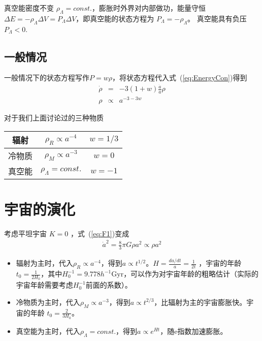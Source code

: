 \documentclass[12pt]{ctexart}
\newcommand{\refeq}[1]{式~(\ref{#1})}
\begin{document}
真空能密度不变 $\rho_\Lambda=const.$，膨胀时外界对内部做功，能量守恒$\Delta E = -\rho_\Lambda \Delta V = P_\Lambda \Delta V$，即真空能的状态方程为 $P_\Lambda = -\rho_\Lambda$。 真空能具有负压 $P_\Lambda < 0 $.

\subsection{一般情况}

一般情况下的状态方程写作$P=w\rho$，将状态方程代入\refeq{eq:EnergyCon}得到
\begin{eqnarray}
    \dot{\rho} &=& -3(1+w) \frac{\dot{a}}{a} \rho 
    \\ \rho &\propto& a^{-3-3w}
\end{eqnarray}

对于我们上面讨论过的三种物质
\begin{table}[htb]
    \centering
    \begin{tabular}{|c|c|c|}
    \hline
    辐射  & $\rho_R\propto a^{-4}$ & $w=1/3$ \\ \hline
    冷物质 & $\rho_M\propto a^{-3}$ & $w=0$   \\ \hline
    真空能 & $\rho_\Lambda=const.$  & $w=-1$  \\ \hline
    \end{tabular}
\end{table}

\section{宇宙的演化}

考虑平坦宇宙 $K=0$ ，\refeq{eq:F1}变成
\begin{eqnarray}
    \dot{a}^2 = \frac{8}{3} \pi G \rho a^2 \propto \rho a^2
\end{eqnarray} 

\begin{itemize}
    \item 辐射为主时，代入$\rho_R\propto a^{-4}$，得到$a\propto t^{1/2}$。$H=\frac{da/dt}{a}=\frac{1}{2t}$ ，宇宙的年龄 $t_0=\frac{1}{2H_0}$，其中$H_0^{-1}= 9.778 h^{-1} \mathrm{Gyr}$，可以作为对宇宙年龄的粗略估计（实际的宇宙年龄需要考虑$H_0^{-1}$前面的系数）。
    \item 冷物质为主时，代入$\rho_M\propto a^{-3}$，得到$a\propto t^{2/3}$，比辐射为主的宇宙膨胀快。宇宙的年龄 $t_0=\frac{2}{3H_0}$。
    \item 真空能为主时，代入$\rho_\Lambda =const.$，得到$a\propto e^{Ht}$，随e指数加速膨胀。
\end{itemize}
\end{document}

